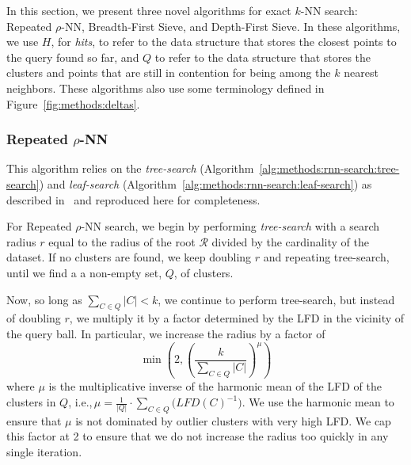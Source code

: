 In this section, we present three novel algorithms for exact $k$-NN search:
Repeated $\rho$-NN, Breadth-First Sieve, and Depth-First Sieve.
In these algorithms, we use $H$, for \textit{hits}, to refer to the data structure that stores the closest points to the query found so far, and $Q$ to refer to the data structure that stores the clusters and points that are still in contention for being among the $k$ nearest neighbors.
These algorithms also use some terminology defined in Figure~\ref{fig:methods:deltas}.


\subsubsection{Repeated \texorpdfstring{$\rho$}{p}-NN}
\label{sec:methods:knn-search:repeated-rnn}

This algorithm relies on the \textit{tree-search} (Algorithm~\ref{alg:methods:rnn-search:tree-search}) and \textit{leaf-search} (Algorithm~\ref{alg:methods:rnn-search:leaf-search}) as described in~\cite{ishaq2019clustered} and reproduced here for completeness.

For Repeated $\rho$-NN search, we begin by performing \textit{tree-search} with a search radius $r$ equal to the radius of the root $\mathcal{R}$ divided by the cardinality of the dataset.
If no clusters are found, we keep doubling $r$ and repeating tree-search, until we find a a non-empty set, $Q$, of clusters.

Now, so long as $\sum_{C \in Q} |C| < k$, we continue to perform tree-search, but instead of doubling $r$, we multiply it by a factor determined by the LFD in the vicinity of the query ball.
In particular, we increase the radius by a factor of
\begin{equation}
    \min \left(2, \left( {\frac{k}{\sum_{C \in Q} |C|}} \right)^{\mu} \right)
    \label{eq:methods:repeated-rnn-factor}
\end{equation}
where $\mu$ is the multiplicative inverse of the harmonic mean of the LFD of the clusters in $Q$, i.e.,\,$\mu = \frac{1}{|Q|} \cdot \sum_{C \in Q} \big( LFD(C)^{-1} \big)$.
We use the harmonic mean to ensure that $\mu$ is not dominated by outlier clusters with very high LFD.
We cap this factor at 2 to ensure that we do not increase the radius too quickly in any single iteration.


